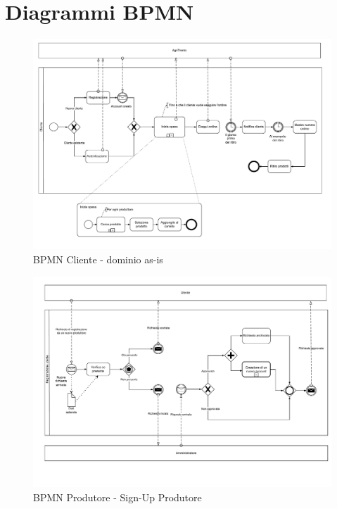 
\section{Diagrammi BPMN}

\begin{landscape}

\begin{figure}[h!]
    \centering
    \includegraphics[trim= 0cm 0cm 0cm 0cm, clip, width=0.95\linewidth]{Deliverables/first-deliverable/img/BPMN/BPMN-as-is-clientDomain.drawio.pdf}
    \caption{BPMN Cliente - dominio as-is }
\end{figure}

\end{landscape}

\newpage

\begin{landscape}

\begin{figure}[h!]
    \centering
    \includegraphics[trim= 0cm 0cm 0cm 0cm, clip, width=0.95\linewidth]{Deliverables/first-deliverable/img/BPMN/BPMN-lowLevel-createNewAccount.drawio.pdf}
    \caption{BPMN Produtore - Sign-Up Produtore }
\end{figure}

\end{landscape}

\restoregeometry
